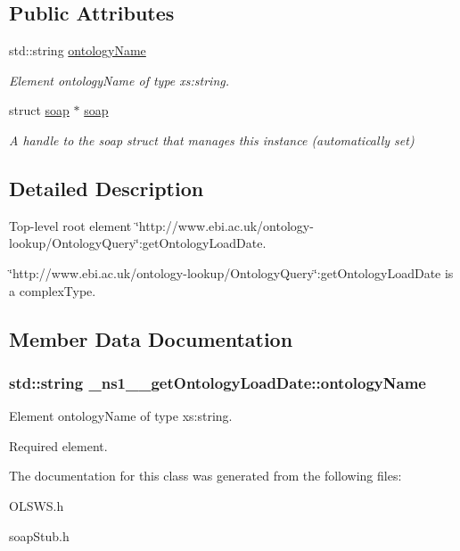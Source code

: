 \subsection*{Public Attributes}
\begin{DoxyCompactItemize}
\item 
std::string \hyperlink{class__ns1____getOntologyLoadDate_a8cf3c8d9c4d2b800eb02880a294bdff4}{ontologyName}
\begin{DoxyCompactList}\small\item\em Element ontologyName of type xs:string. \end{DoxyCompactList}\item 
\hypertarget{class__ns1____getOntologyLoadDate_aa435b88fb939b1ae7cb2fd38aa836c1f}{
struct \hyperlink{class__ns1____getOntologyLoadDate_aa435b88fb939b1ae7cb2fd38aa836c1f}{soap} $\ast$ \hyperlink{class__ns1____getOntologyLoadDate_aa435b88fb939b1ae7cb2fd38aa836c1f}{soap}}
\label{class__ns1____getOntologyLoadDate_aa435b88fb939b1ae7cb2fd38aa836c1f}

\begin{DoxyCompactList}\small\item\em A handle to the soap struct that manages this instance (automatically set) \end{DoxyCompactList}\end{DoxyCompactItemize}


\subsection{Detailed Description}
Top-\/level root element \char`\"{}http://www.ebi.ac.uk/ontology-\/lookup/OntologyQuery\char`\"{}:getOntologyLoadDate. 

\char`\"{}http://www.ebi.ac.uk/ontology-\/lookup/OntologyQuery\char`\"{}:getOntologyLoadDate is a complexType. 

\subsection{Member Data Documentation}
\hypertarget{class__ns1____getOntologyLoadDate_a8cf3c8d9c4d2b800eb02880a294bdff4}{
\subsubsection[{ontologyName}]{\setlength{\rightskip}{0pt plus 5cm}std::string {\bf \_\-ns1\_\-\_\-getOntologyLoadDate::ontologyName}}}
\label{class__ns1____getOntologyLoadDate_a8cf3c8d9c4d2b800eb02880a294bdff4}


Element ontologyName of type xs:string. 

Required element. 

The documentation for this class was generated from the following files:\begin{DoxyCompactItemize}
\item 
OLSWS.h\item 
soapStub.h\end{DoxyCompactItemize}
